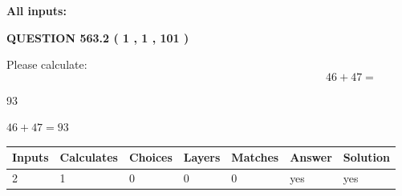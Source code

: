 \documentclass[12pt]{article}
\begin{document}
   
   
   
\noindent{}
   
   
   
   
\noindent\vspace{0.1in}\hspace{-0.08in} {\textbf{\Large{All inputs: }}}
   
   
  
\vspace{0.2in}
  
{\textbf{\Large{QUESTION
563.2 
 ( 1 , 1 , 101 )
}}}
  
  
 
Please calculate:
\begin{equation}
46 +  %
47 = \nonumber
\end{equation}
 
 
 
\noindent{}
 
 

93
 
 
\noindent{}
 
 

 
 
 
\noindent{}
 
 

$ %
46 +  %
47=   %
93$
 
 
\noindent{}
 
 

 
   
   
   
   
\noindent\begin{tabular}{|l|l|l|l|l|l|l|}
 \hline
Inputs & Calculates & Choices & Layers & Matches & Answer & Solution \\ \hline
 2  & 
 1  & 
 0
  & 
 0  & 
 0  & 
  yes & 
  yes 
  \\ \hline
 \end{tabular}
   
   
   
   
\noindent{}
   
\end{document}
